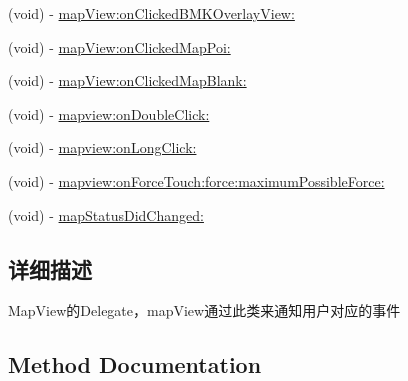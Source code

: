 \begin{DoxyCompactItemize}
\item 
(void) -\/ \hyperlink{protocol_b_m_k_map_view_delegate-p_a92829c083dcbd0b60209abb023b109fe}{map\+View\+:on\+Clicked\+B\+M\+K\+Overlay\+View\+:}
\item 
(void) -\/ \hyperlink{protocol_b_m_k_map_view_delegate-p_ac3e98436fce2ee14c02837200e57a6fe}{map\+View\+:on\+Clicked\+Map\+Poi\+:}
\item 
(void) -\/ \hyperlink{protocol_b_m_k_map_view_delegate-p_a7e98b75f0edfc05ed93fda98f3fb682e}{map\+View\+:on\+Clicked\+Map\+Blank\+:}
\item 
(void) -\/ \hyperlink{protocol_b_m_k_map_view_delegate-p_a957fb04d2fb88bd0e45ad9d712c1e85f}{mapview\+:on\+Double\+Click\+:}
\item 
(void) -\/ \hyperlink{protocol_b_m_k_map_view_delegate-p_abdef3e78c6a4d51665bc859e16c629a4}{mapview\+:on\+Long\+Click\+:}
\item 
(void) -\/ \hyperlink{protocol_b_m_k_map_view_delegate-p_a1715deab8f5cc59b50c05d222712f163}{mapview\+:on\+Force\+Touch\+:force\+:maximum\+Possible\+Force\+:}
\item 
(void) -\/ \hyperlink{protocol_b_m_k_map_view_delegate-p_a06d810eed5ca8add043ab4cd9367f14f}{map\+Status\+Did\+Changed\+:}
\end{DoxyCompactItemize}


\subsection{详细描述}
Map\+View的\+Delegate，map\+View通过此类来通知用户对应的事件 

\subsection{Method Documentation}
\hypertarget{protocol_b_m_k_map_view_delegate-p_a06d810eed5ca8add043ab4cd9367f14f}{}
